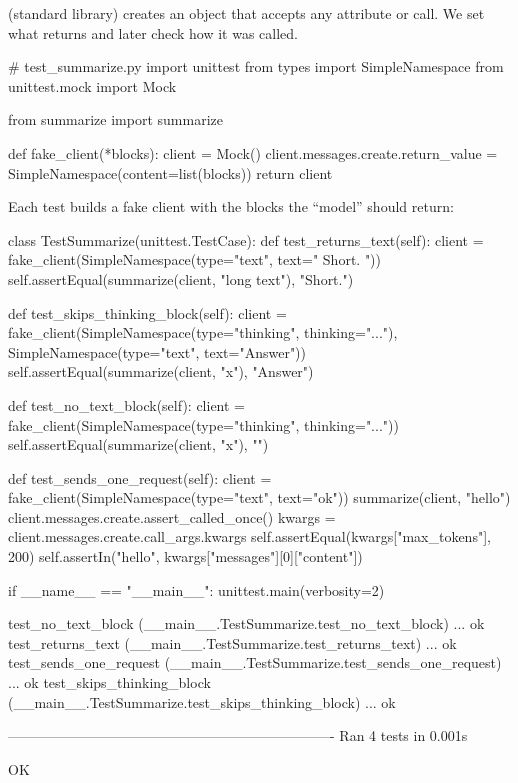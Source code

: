  (standard library) creates an object that accepts any attribute or call. We set what
 returns and later check how it was called.

\begin{pycode}
# test_summarize.py
import unittest
from types import SimpleNamespace
from unittest.mock import Mock

from summarize import summarize


def fake_client(*blocks):
    client = Mock()
    client.messages.create.return_value = SimpleNamespace(content=list(blocks))
    return client
\end{pycode}
Each test builds a fake client with the blocks the ``model'' should return:
\begin{pycode}
class TestSummarize(unittest.TestCase):
    def test_returns_text(self):
        client = fake_client(SimpleNamespace(type="text", text=" Short. "))
        self.assertEqual(summarize(client, "long text"), "Short.")

    def test_skips_thinking_block(self):
        client = fake_client(SimpleNamespace(type="thinking", thinking="..."),
                             SimpleNamespace(type="text", text="Answer"))
        self.assertEqual(summarize(client, "x"), "Answer")

    def test_no_text_block(self):
        client = fake_client(SimpleNamespace(type="thinking", thinking="..."))
        self.assertEqual(summarize(client, "x"), "")

    def test_sends_one_request(self):
        client = fake_client(SimpleNamespace(type="text", text="ok"))
        summarize(client, "hello")
        client.messages.create.assert_called_once()
        kwargs = client.messages.create.call_args.kwargs
        self.assertEqual(kwargs["max_tokens"], 200)
        self.assertIn("hello", kwargs["messages"][0]["content"])


if __name__ == "__main__":
    unittest.main(verbosity=2)
\end{pycode}
\begin{rawcode}
test_no_text_block (__main__.TestSummarize.test_no_text_block) ... ok
test_returns_text (__main__.TestSummarize.test_returns_text) ... ok
test_sends_one_request (__main__.TestSummarize.test_sends_one_request) ... ok
test_skips_thinking_block (__main__.TestSummarize.test_skips_thinking_block) ... ok

----------------------------------------------------------------------
Ran 4 tests in 0.001s

OK
\end{rawcode}

